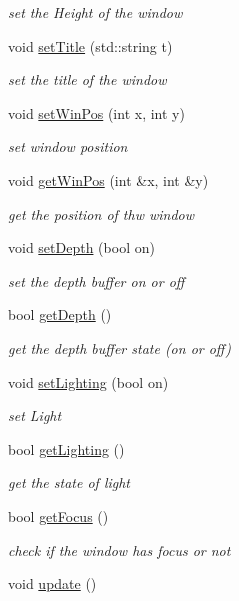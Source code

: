 \begin{DoxyCompactItemize}
\begin{DoxyCompactList}\small\item\em set the Height of the window \end{DoxyCompactList}\item 
void \hyperlink{class_render_engine_acc455c0e6073b67859e5c8343f9634a1}{set\-Title} (std\-::string t)
\begin{DoxyCompactList}\small\item\em set the title of the window \end{DoxyCompactList}\item 
void \hyperlink{class_render_engine_aaac5e48c7d25024cd2ae9d9b86ea2e41}{set\-Win\-Pos} (int x, int y)
\begin{DoxyCompactList}\small\item\em set window position \end{DoxyCompactList}\item 
void \hyperlink{class_render_engine_a8ec2ff634d1b42287cf54c07b2fce7d5}{get\-Win\-Pos} (int \&x, int \&y)
\begin{DoxyCompactList}\small\item\em get the position of thw window \end{DoxyCompactList}\item 
void \hyperlink{class_render_engine_a03173b737d8eb90afe2b2e41ae45782f}{set\-Depth} (bool on)
\begin{DoxyCompactList}\small\item\em set the depth buffer on or off \end{DoxyCompactList}\item 
bool \hyperlink{class_render_engine_a7613fd73a0813a595f4683f49bfb6888}{get\-Depth} ()
\begin{DoxyCompactList}\small\item\em get the depth buffer state (on or off) \end{DoxyCompactList}\item 
void \hyperlink{class_render_engine_af7293647c6835d3264a4f6b7aec5d79f}{set\-Lighting} (bool on)
\begin{DoxyCompactList}\small\item\em set Light \end{DoxyCompactList}\item 
bool \hyperlink{class_render_engine_ab6509900a3985ed9f48d23afd83f8f73}{get\-Lighting} ()
\begin{DoxyCompactList}\small\item\em get the state of light \end{DoxyCompactList}\item 
bool \hyperlink{class_render_engine_a7b9691e101c8faffb68da2ba3ef94e79}{get\-Focus} ()
\begin{DoxyCompactList}\small\item\em check if the window has focus or not \end{DoxyCompactList}\item 
\hypertarget{class_render_engine_ac84ced7bed02e9e99166610d593e97ba}{void \hyperlink{class_render_engine_ac84ced7bed02e9e99166610d593e97ba}{update} ()}\label{class_render_engine_ac84ced7bed02e9e99166610d593e97ba}


\end{DoxyCompactItemize}
